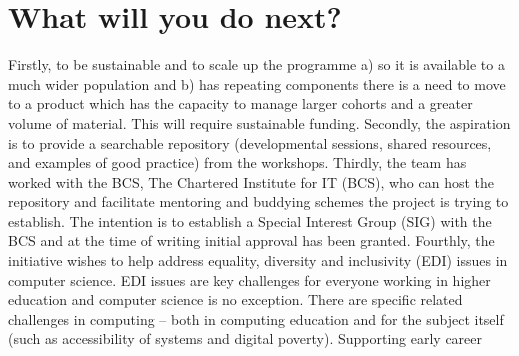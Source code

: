 \documentclass[sigconf]{acmart}
\begin{document}

\section{What will you do next?}
\begin{comment}

Scaling up


Funding 


Shared CPD learning materials


Address EDI issues in computer science


Reverse mentoring


Align with BCS


Special interest group

Web space for repository and functionality (mentoring, buddying) to store CPD sessions, shared resources for new CS academics, examples of good practice and a discussion space.

Explore what BCS are doing with professionals in non academic roles

Encourage research on pedagogy and educational issues in CS

Examine if programme framework is transferrable to other disciplines
\end{comment}
Firstly, to be sustainable and to scale up the programme a) so it is
available to a much wider population and b) has repeating components
there is a need to move to a product which has the capacity to manage
larger cohorts and a greater volume of material. This will require
sustainable funding. Secondly, the aspiration is to provide a
searchable repository (developmental sessions, shared resources, and
examples of good practice) from the workshops. Thirdly, the team has
worked with the BCS, The Chartered Institute for IT (BCS), who can
host the repository and facilitate mentoring and buddying schemes the
project is trying to establish. The intention is to establish a
Special Interest Group (SIG) with the BCS \cite{BCSSIG} and at the
time of writing initial approval has been granted. Fourthly, the
initiative wishes to help address equality, diversity and inclusivity
(EDI) issues in computer science. EDI issues are key challenges for
everyone working in higher education and computer science is no
exception. There are specific related challenges in computing – both
in computing education and for the subject itself (such as
accessibility of systems and digital poverty). Supporting early career
\end{document}
